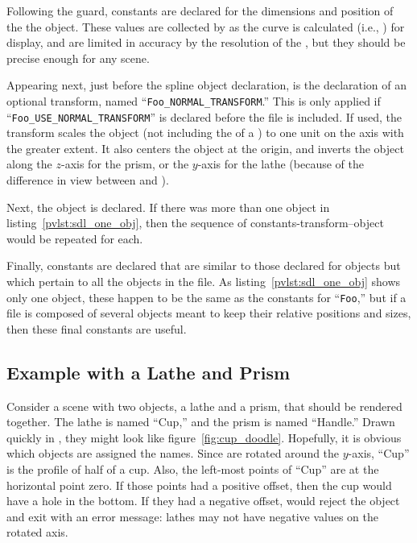 		Following the guard, constants are declared for the
		dimensions and position of the the object.
		These values are collected
		by \IXpkg{} as the curve is calculated
		(i.e., ) for display,
		and are limited in accuracy by the resolution of the
		, but they should be precise enough
		for any scene.
		
		Appearing next, just before the spline object
		declaration, is the declaration of an optional transform,
		named ``\texttt{Foo\_NORMAL\_TRANSFORM}.''
		This is only applied if
		``\texttt{Foo\_USE\_NORMAL\_TRANSFORM}''
		is declared before the
		file is included. If used, the transform scales the object
		(not including the \emph{} of a )
		to one unit on the axis with the greater extent. It also
		centers the object at the origin, and inverts the object
		along the $z$-axis for the prism,
		or the $y$-axis for the lathe (because of the difference in view
		between \IXpov{} and \IXpkg{}).
		
		Next, the object is declared. If there was more than
		one object in listing~\ref{pvlst:sdl_one_obj},
		then the sequence of constants-transform--object would
		be repeated for each.
		
		Finally, constants are declared that are similar to those
		declared for objects
		but which pertain to all the objects in the file.
		As listing~\ref{pvlst:sdl_one_obj} shows only one object,
		these happen to be the same as the constants for
		``\texttt{Foo},'' but if a file is composed of several
		objects meant to keep their relative positions and sizes,
		then these final constants are useful.


		\subsection{Example with a Lathe and Prism}%
		\label{ssec:ex_lath_and_prism}
		Consider a scene with two objects, a lathe and a
		prism, that should be rendered together. The lathe
		is named ``Cup,'' and the prism is named ``Handle.''
		Drawn quickly in \IXpkg{}, they might look like
		figure~\ref{fig:cup_doodle}.
		Hopefully, it is obvious which objects are assigned
		the names. Since  are rotated around
		the $y$-axis, ``Cup'' is the profile of half of a cup.
		Also, the left-most points of ``Cup'' are at the
		horizontal point zero. If those points had a positive
		offset, then the cup would have a hole in the bottom.
		If they had a negative offset, \IXpov{} would reject
		the object and exit with an error message: lathes may
		not have negative values on the rotated axis.


